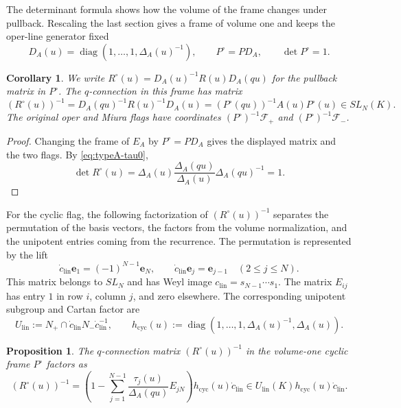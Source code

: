 \documentclass[11pt,leqno]{amsart}
\numberwithin{equation}{section}
\theoremstyle{plain}
\newtheorem{proposition}[theorem]{Proposition}
\newtheorem{corollary}[theorem]{Corollary}
\theoremstyle{definition}
\theoremstyle{plain}
\theoremstyle{definition}
\theoremstyle{remark}
\begin{document}
The determinant formula shows how the volume of the frame changes under pullback. Rescaling the last section gives a frame of volume one and keeps the oper-line generator fixed
\begin{equation}\label{eq:typeA-volume-correction}
 D_A(u)=\operatorname{diag}(1,\ldots,1,\Delta_A(u)^{-1}),
 \qquad P^\circ=P D_A,\qquad \det P^\circ=1.
\end{equation}
\begin{corollary}\label{cor:typeA-companion-volume-normalization}
We write $R^\circ(u)=D_A(u)^{-1}R(u)D_A(qu)$ for the pullback matrix in $P^\circ$. The $q$-connection in this frame has matrix
\begin{equation}\label{eq:typeA-volume-qtransport}
 (R^\circ(u))^{-1}
 =D_A(qu)^{-1}R(u)^{-1}D_A(u)
 =(P^\circ(qu))^{-1}A(u)P^\circ(u)\in SL_N(K).
\end{equation}
The original oper and Miura flags have coordinates $(P^\circ)^{-1}\mathcal F_+$ and $(P^\circ)^{-1}\mathcal F_-$.
\end{corollary}
\begin{proof}
Changing the frame of $E_A$ by $P^\circ=P D_A$ gives the displayed matrix and the two flags.  By \eqref{eq:typeA-tau0},
\[
 \det R^\circ(u)
 =\Delta_A(u)\frac{\Delta_A(qu)}{\Delta_A(u)}\Delta_A(qu)^{-1}=1.
\]
\end{proof}

For the cyclic flag, the following factorization of $(R^\circ(u))^{-1}$ separates the permutation of the basis vectors, the factors from the volume normalization, and the unipotent entries coming from the recurrence. The permutation is represented by the lift
\begin{equation}\label{eq:typeA-linear-Coxeter-lift}
 \dot c_{\mathrm{lin}}\mathbf e_1=(-1)^{N-1}\mathbf e_N,\qquad
 \dot c_{\mathrm{lin}}\mathbf e_j=\mathbf e_{j-1}\quad(2\le j\le N).
\end{equation}
This matrix belongs to $SL_N$ and has Weyl image
$c_{\mathrm{lin}}=s_{N-1}\cdots s_1$.  The matrix $E_{ij}$ has entry $1$ in row $i$, column $j$, and zero elsewhere.  The corresponding unipotent subgroup and Cartan factor are
\[
 U_{\mathrm{lin}}:=N_+\cap
       \dot c_{\mathrm{lin}}N_-\dot c_{\mathrm{lin}}^{-1},
 \qquad
 h_{\mathrm{cyc}}(u):=
       \operatorname{diag}(1,\ldots,1,\Delta_A(u)^{-1},\Delta_A(u)).
\]

\begin{proposition}\label{prop:typeA-cyclic-Steinberg}
The $q$-connection matrix $(R^\circ(u))^{-1}$ in the volume-one cyclic frame $P^\circ$ factors as
\begin{equation}\label{eq:typeA-cyclic-Steinberg}
 (R^\circ(u))^{-1}
 =\left(1-\sum_{j=1}^{N-1}
        \frac{\tau_j(u)}{\Delta_A(qu)}E_{jN}\right)
       h_{\mathrm{cyc}}(u)\dot c_{\mathrm{lin}}
 \in U_{\mathrm{lin}}(K)h_{\mathrm{cyc}}(u)\dot c_{\mathrm{lin}}.
\end{equation}
\end{proposition}
\end{document}
